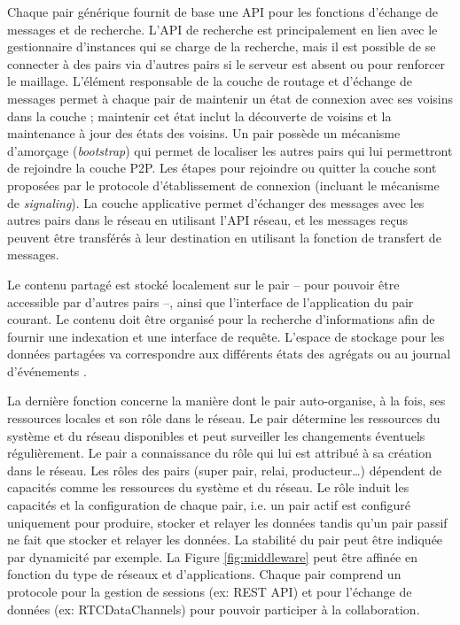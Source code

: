 Chaque pair générique fournit de base une \gls{API} pour les fonctions d'échange 
de messages et de recherche. 
L'\gls{API} de recherche est principalement en lien avec le 
gestionnaire d'instances qui se charge de la recherche, mais il est possible de se 
connecter à des pairs via d'autres pairs si le serveur est absent ou pour renforcer 
le maillage.
L'élément responsable de la couche de routage et d'échange de messages permet 
à chaque pair de maintenir un état de connexion avec ses voisins dans la couche 
; maintenir cet état inclut la découverte de voisins et la maintenance  à jour des 
états des voisins.
Un pair possède un mécanisme d'amorçage (\textit{bootstrap}) qui permet de 
localiser les autres pairs qui lui permettront de rejoindre la couche \gls{P2P}. Les 
étapes pour rejoindre ou quitter la couche sont proposées par le protocole 
d'établissement de connexion (incluant le mécanisme de \textit{signaling}).
La couche applicative permet d'échanger des messages avec les autres pairs 
dans le réseau en utilisant l'\gls{API} réseau, et les messages reçus peuvent être 
transférés à leur destination en utilisant la fonction de transfert de messages. 

Le contenu partagé est stocké localement sur le pair -- pour pouvoir être 
accessible par d'autres pairs --, ainsi que l'interface de l'application du pair courant. 
Le contenu doit être organisé pour la recherche d'informations afin de fournir une 
indexation et une interface de requête. 
L'espace de stockage pour les données partagées va correspondre aux différents 
états des agrégats \cite{Desprat2015a,Desprat2015b} ou au journal d'événements 
\cite{Desprat2016,Desprat2017}.


La dernière fonction concerne la manière dont le pair auto-organise, à la fois, ses 
ressources locales et son rôle dans le réseau. Le pair détermine les 
ressources du système et du réseau disponibles et peut surveiller les 
changements éventuels régulièrement.
Le pair a connaissance du rôle qui lui est attribué à sa création dans le réseau. 
Les rôles des pairs (super pair, relai, producteur\dots) dépendent de 
capacités comme les ressources du système et du réseau. Le rôle induit les 
capacités et la configuration de chaque pair, i.e. un pair actif est configuré 
uniquement pour produire, stocker et relayer les données tandis qu'un pair passif 
ne fait que stocker et relayer les données. La stabilité du pair peut être indiquée 
par dynamicité par exemple. 
La Figure \ref{fig:middleware} peut être affinée en fonction du type de 
réseaux et d'applications. Chaque pair comprend un protocole pour la gestion
de sessions (ex: REST API) et pour l'échange de données (ex: RTCDataChannels)  
pour pouvoir participer à la collaboration.



